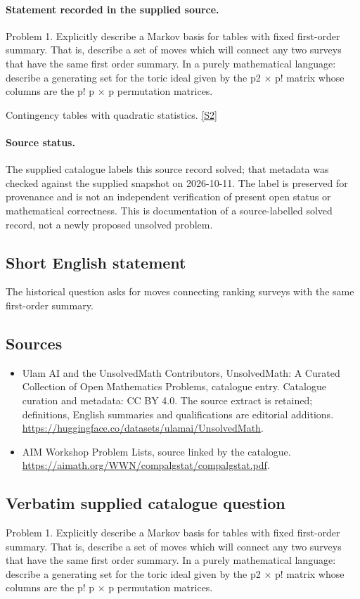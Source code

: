 \documentclass[11pt]{article}
\begin{document}
\paragraph{Statement recorded in the supplied source.}
Problem 1. Explicitly describe a Markov basis for tables with fixed first-order summary. That is, describe a set of moves which will connect any two surveys that have the same first order summary. In a purely mathematical language: describe a generating set for the toric ideal given by the p2 × p! matrix whose columns are the p! p × p permutation matrices.

Contingency tables with quadratic statistics. \href{https://aimath.org/WWN/compalgstat/compalgstat.pdf}{[S2]}
\paragraph{Source status.}
The supplied catalogue labels this source record solved; that metadata was checked against the supplied snapshot on 2026-10-11. The label is preserved for provenance and is not an independent verification of present open status or mathematical correctness. This is documentation of a source-labelled solved record, not a newly proposed unsolved problem.
\subsection{Short English statement}
The historical question asks for moves connecting ranking surveys with the same first-order summary.
\subsection{Sources}
\begin{itemize}
\item[S1] Ulam AI and the UnsolvedMath Contributors, UnsolvedMath: A Curated Collection of Open Mathematics Problems, catalogue entry. Catalogue curation and metadata: CC BY 4.0. The source extract is retained; definitions, English summaries and qualifications are editorial additions.
\url{https://huggingface.co/datasets/ulamai/UnsolvedMath}.
\item[S2] AIM Workshop Problem Lists, source linked by the catalogue.
\url{https://aimath.org/WWN/compalgstat/compalgstat.pdf}.
\end{itemize}
\subsection{Verbatim supplied catalogue question}
Problem 1. Explicitly describe a Markov basis for tables with fixed first-order summary. That is, describe a set of moves which will connect any two surveys that have the same first order summary. In a purely mathematical language: describe a generating set for the toric ideal given by the p2 × p! matrix whose columns are the p! p × p permutation matrices.
\end{document}
